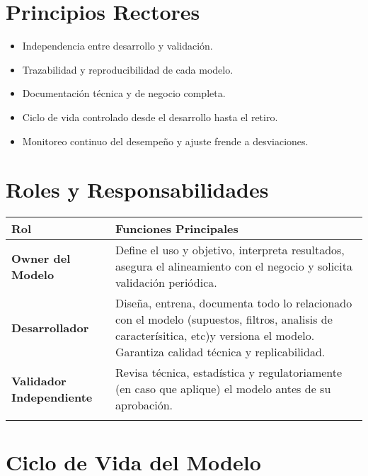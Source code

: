 \documentclass[11pt,oneside]{article}%
\begin{document}
\section{Principios Rectores}
\begin{itemize}
\item Independencia entre desarrollo y validación. 
\item Trazabilidad y reproducibilidad de cada modelo. 
\item Documentación técnica y de negocio completa. 
\item Ciclo de vida controlado desde el desarrollo hasta el retiro. 
\item Monitoreo continuo del desempeño y ajuste frende a desviaciones. 
\end{itemize}

\section{Roles y Responsabilidades}

\begin{longtable}{>{\bfseries}p{5cm}  p{10cm}}
\toprule
\rowcolor{ficoblue}
\color{white}\textbf{Rol}  & \color{white}\textbf{Funciones Principales} \\
 \midrule
Owner del Modelo           & Define el uso y objetivo, interpreta resultados, asegura el alineamiento con el negocio y solicita validación periódica. \\
\addlinespace
Desarrollador                  & Diseña, entrena, documenta todo lo relacionado con el modelo (supuestos, filtros, analisis de caracterísitica, etc)y versiona el modelo. Garantiza calidad técnica y replicabilidad.\\
\addlinespace
Validador Independiente  & Revisa técnica, estadística y regulatoriamente (en caso que aplique) el modelo antes de su aprobación. \\ 
\addlinespace
\bottomrule
\end{longtable}
\section{Ciclo de Vida del Modelo}

\end{document}
